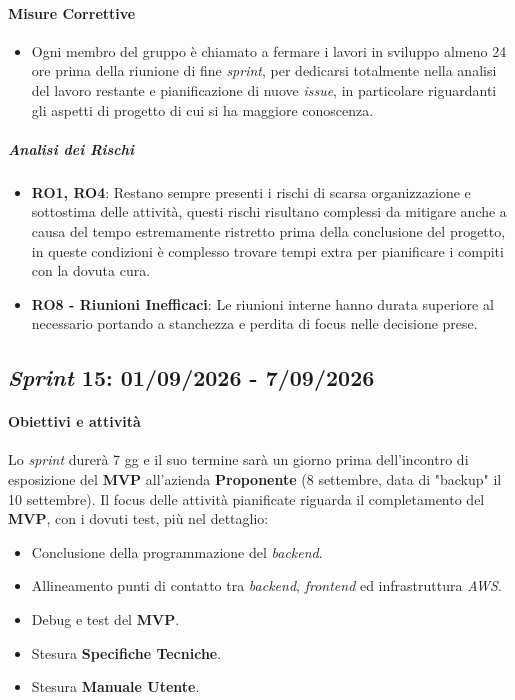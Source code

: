 \documentclass[12pt, a4paper]{article}
\begin{document}
{\paragraph{Misure Correttive}
\begin{itemize}
    \item Ogni membro del gruppo è chiamato a fermare i lavori in sviluppo almeno 24 ore prima della riunione di fine \textit{sprint}, per dedicarsi totalmente nella analisi del lavoro restante e pianificazione di nuove \textit{issue}, in particolare riguardanti gli aspetti di progetto di cui si ha maggiore conoscenza.
\end{itemize}

\subparagraph{Analisi dei Rischi}
\begin{itemize}
    \item \textbf{RO1, RO4}: Restano sempre presenti i rischi di scarsa organizzazione e sottostima delle attività, questi rischi risultano complessi da mitigare anche a causa del tempo estremamente ristretto prima della conclusione del progetto, in queste condizioni è complesso trovare tempi extra per pianificare i compiti con la dovuta cura.
    \item \textbf{RO8 - Riunioni Inefficaci}: Le riunioni interne hanno durata superiore al necessario portando a stanchezza e perdita di focus nelle decisione prese.
\end{itemize}



\subsection{\textit{Sprint} 15: 01/09/2026 - 7/09/2026}
\paragraph{Obiettivi e attività} Lo \textit{sprint} durerà 7 gg e il suo termine sarà un giorno prima dell'incontro di esposizione del \textbf{MVP} all'azienda \textbf{Proponente} (8 settembre, data di "backup" il 10 settembre).
Il focus delle attività pianificate riguarda il completamento del \textbf{MVP}, con i dovuti test, più nel dettaglio:
\begin{itemize}
    \item Conclusione della programmazione del \textit{backend}.
    \item Allineamento punti di contatto tra \textit{backend}, \textit{frontend} ed infrastruttura \textit{AWS}.
    \item Debug e test del \textbf{MVP}.
    \item Stesura \textbf{Specifiche Tecniche}.
    \item Stesura \textbf{Manuale Utente}.
\end{itemize}

}
\end{document}
